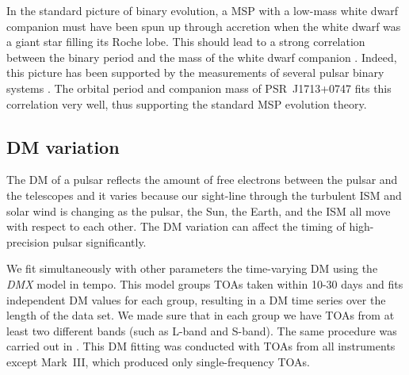 In the standard picture of binary evolution, a MSP with a low-mass white dwarf companion must have been spun up through accretion when the white dwarf was a giant star filling its Roche lobe. 
This should lead to a strong correlation between the binary period and the mass of the white dwarf companion \citep{rpj+95, ts99a, prp02b}. 
Indeed, this picture has been supported by the measurements of several pulsar
binary systems \citep[e.g.,][]{vbb+01, ktr94, th14}.  
The orbital period and companion mass of PSR~J1713+0747 fits
this correlation very well, thus supporting the standard MSP evolution theory. %




\subsection{DM variation}
\label{sec:dmx}
The DM of a pulsar reflects the amount of free electrons between
the pulsar and the telescopes and it varies because
our sight-line through the turbulent ISM and solar wind is changing as the
pulsar, the Sun, the Earth, and the ISM all move with respect to each other.
The DM variation can affect the timing of high-precision pulsar significantly.

We fit simultaneously with other parameters the time-varying DM using the {\it DMX} model in {\sc tempo}.
This model groups TOAs taken within 10-30 days and fits independent DM values for each group, resulting in a DM time series over the length of the data set.
We made sure that in each group we have TOAs
from at least two different bands (such as L-band and S-band). 
The same procedure was carried out in
\citet{dfg+13}.  This DM fitting was conducted with TOAs from all
instruments except Mark~III, which produced only single-frequency TOAs.

